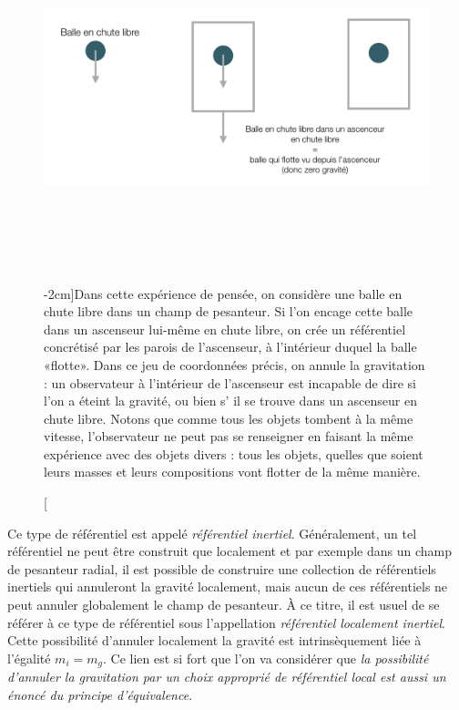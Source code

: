 \begin{figure}[htbp]
	\centering
		\includegraphics[height=10cm]{figs/ascenceur.png}
	\caption[Annulation du champ de pesanteur][-2cm]{Dans cette expérience de pensée, on considère une balle en chute libre dans un champ de pesanteur. Si l’on encage cette balle dans un ascenseur lui-même en chute libre, on crée un référentiel concrétisé par les parois de l'ascenseur, à l'intérieur duquel la balle «flotte». Dans ce jeu de coordonnées précis, on annule la gravitation : un observateur à l'intérieur de l'ascenseur est incapable de dire si l’on a éteint la gravité, ou bien s’ il se trouve dans un ascenseur en chute libre. Notons que comme tous les objets tombent à la même vitesse, l'observateur ne peut pas se renseigner en faisant la même expérience avec des objets divers : tous les objets, quelles que soient leurs masses et leurs compositions vont flotter de la même manière. }
	\label{f:ascenceur}
\end{figure}


Ce type de référentiel est appelé \textit{référentiel inertiel}. Généralement, un tel référentiel ne peut être construit que localement et par exemple dans un champ de pesanteur radial, il est possible de construire une collection de référentiels inertiels qui annuleront la gravité localement, mais aucun de ces référentiels ne peut annuler globalement le champ de pesanteur. À ce titre, il est usuel de se référer à ce type de référentiel sous l'appellation \textit{référentiel localement inertiel}. Cette possibilité d'annuler localement la gravité est intrinsèquement liée à l'égalité $m_i=m_g$. Ce lien est si fort que l'on va considérer que \textit{la possibilité d'annuler la gravitation par un choix approprié de référentiel local est aussi un énoncé du principe d'équivalence}. 

